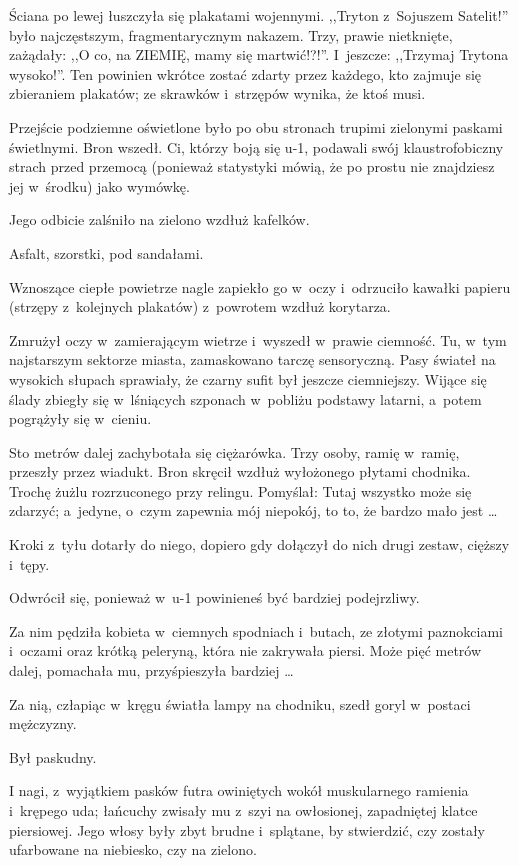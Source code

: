 \documentclass[oneside,polish,11pt,rmheadings]{mwbk}
\begin{document}
Ściana po lewej łuszczyła się plakatami wojennymi. ,,Tryton z~Sojuszem Satelit!'' było najczęstszym, fragmentarycznym nakazem. Trzy, prawie nietknięte, zażądały: ,,O co, na ZIEMIĘ, mamy się martwić!?!''. I~jeszcze: ,,Trzymaj Trytona wysoko!''. Ten powinien wkrótce zostać zdarty przez każdego, kto zajmuje się zbieraniem plakatów; ze skrawków i~strzępów wynika, że ktoś musi. 

Przejście podziemne oświetlone było po obu stronach trupimi zielonymi paskami świetlnymi. Bron wszedł. Ci, którzy boją się u-1, podawali swój klaustrofobiczny strach przed przemocą (ponieważ statystyki mówią, że po prostu nie znajdziesz jej w~środku) jako wymówkę. 

Jego odbicie zalśniło na zielono wzdłuż kafelków. 

Asfalt, szorstki, pod sandałami. 

Wznoszące ciepłe powietrze nagle zapiekło go w~oczy i~odrzuciło kawałki papieru (strzępy z~kolejnych plakatów) z~powrotem wzdłuż korytarza. 

Zmrużył oczy w~zamierającym wietrze i~wyszedł w~prawie ciemność. Tu, w~tym najstarszym sektorze miasta, zamaskowano tarczę sensoryczną. Pasy świateł na wysokich słupach sprawiały, że czarny sufit był jeszcze ciemniejszy. Wijące się ślady zbiegły się w~lśniących szponach w~pobliżu podstawy latarni, a~potem pogrążyły się w~cieniu. 

Sto metrów dalej zachybotała się ciężarówka. Trzy osoby, ramię w~ramię, przeszły przez wiadukt. Bron skręcił wzdłuż wyłożonego płytami chodnika. Trochę żużlu rozrzuconego przy relingu. Pomyślał: Tutaj wszystko może się zdarzyć; a~jedyne, o~czym zapewnia mój niepokój, to to, że bardzo mało jest \ldots  

Kroki z~tyłu dotarły do niego, dopiero gdy dołączył do nich drugi zestaw, cięższy i~tępy. 

Odwrócił się, ponieważ w~u-1 powinieneś być bardziej podejrzliwy. 

Za nim pędziła kobieta w~ciemnych spodniach i~butach, ze złotymi paznokciami i~oczami oraz krótką peleryną, która nie zakrywała piersi. Może pięć metrów dalej, pomachała mu, przyśpieszyła bardziej \ldots  

Za nią, człapiąc w~kręgu światła lampy na chodniku, szedł goryl w~postaci mężczyzny. 

Był paskudny. 

I nagi, z~wyjątkiem pasków futra owiniętych wokół muskularnego ramienia i~krępego uda; łańcuchy zwisały mu z~szyi na owłosionej, zapadniętej klatce piersiowej. Jego włosy były zbyt brudne i~splątane, by stwierdzić, czy zostały ufarbowane na niebiesko, czy na zielono. 
\end{document}
